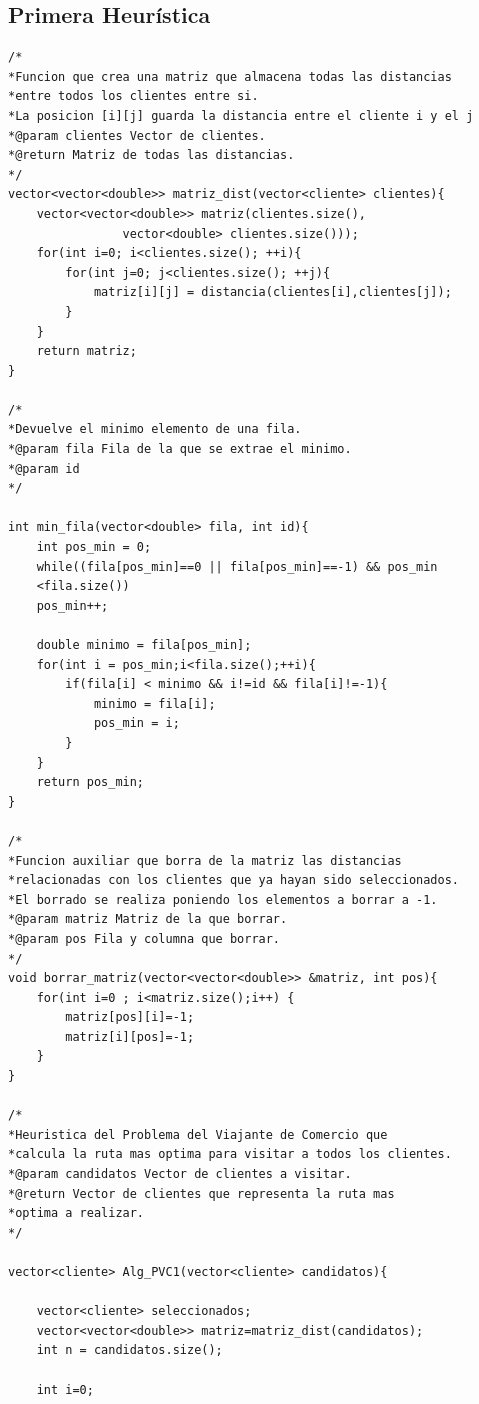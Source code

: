 \documentclass[a4paper,12pt,twoside]{article} %
\begin{document}
\subsection{Primera Heurística}

\lstset{language=C++}
\begin{lstlisting}
/*
*Funcion que crea una matriz que almacena todas las distancias 
*entre todos los clientes entre si.
*La posicion [i][j] guarda la distancia entre el cliente i y el j
*@param clientes Vector de clientes.
*@return Matriz de todas las distancias.
*/
vector<vector<double>> matriz_dist(vector<cliente> clientes){
    vector<vector<double>> matriz(clientes.size(),
                vector<double> clientes.size()));
    for(int i=0; i<clientes.size(); ++i){
        for(int j=0; j<clientes.size(); ++j){
            matriz[i][j] = distancia(clientes[i],clientes[j]);
        }
    }
    return matriz;
}

/*
*Devuelve el minimo elemento de una fila.
*@param fila Fila de la que se extrae el minimo.
*@param id
*/

int min_fila(vector<double> fila, int id){
    int pos_min = 0;
    while((fila[pos_min]==0 || fila[pos_min]==-1) && pos_min 
    <fila.size()) 
    pos_min++;

    double minimo = fila[pos_min];
    for(int i = pos_min;i<fila.size();++i){
        if(fila[i] < minimo && i!=id && fila[i]!=-1){
            minimo = fila[i];
            pos_min = i;
        }
    }
    return pos_min;
}

/*
*Funcion auxiliar que borra de la matriz las distancias 
*relacionadas con los clientes que ya hayan sido seleccionados.
*El borrado se realiza poniendo los elementos a borrar a -1.
*@param matriz Matriz de la que borrar.
*@param pos Fila y columna que borrar.
*/
void borrar_matriz(vector<vector<double>> &matriz, int pos){
    for(int i=0 ; i<matriz.size();i++) {
        matriz[pos][i]=-1;
        matriz[i][pos]=-1;
    }
}

/*
*Heuristica del Problema del Viajante de Comercio que 
*calcula la ruta mas optima para visitar a todos los clientes.
*@param candidatos Vector de clientes a visitar.
*@return Vector de clientes que representa la ruta mas 
*optima a realizar.
*/

vector<cliente> Alg_PVC1(vector<cliente> candidatos){

    vector<cliente> seleccionados;
    vector<vector<double>> matriz=matriz_dist(candidatos);
    int n = candidatos.size();

    int i=0;


\end{lstlisting}
\end{document}
